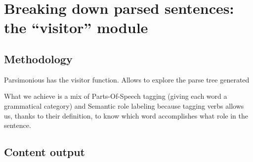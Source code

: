 \chapter{Breaking down parsed sentences: the ``visitor'' module}

\section{Methodology}

Parsimonious has the visitor function. Allows to explore the parse tree generated

What we achieve is a mix of Parts-Of-Speech tagging (giving each word a grammatical category) and Semantic role labeling
because tagging verbs allows us, thanks to their definition, to know which word accomplishes what role in the sentence.



\section{Content output}

